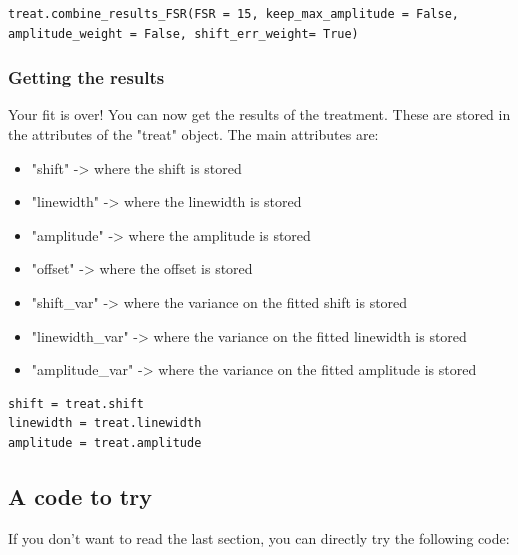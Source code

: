 \documentclass{article}
\begin{document}
\begin{lstlisting}
treat.combine_results_FSR(FSR = 15, keep_max_amplitude = False, amplitude_weight = False, shift_err_weight= True)
\end{lstlisting}

\subsubsection{Getting the results}

Your fit is over! You can now get the results of the treatment. These are stored in the attributes of the "treat" object. The main attributes are:
\begin{itemize}
    \item "shift" -> where the shift is stored
    \item "linewidth" -> where the linewidth is stored
    \item "amplitude" -> where the amplitude is stored
    \item "offset" -> where the offset is stored
    \item "shift\_var" -> where the variance on the fitted shift is stored
    \item "linewidth\_var" -> where the variance on the fitted linewidth is stored
    \item "amplitude\_var" -> where the variance on the fitted amplitude is stored
\end{itemize}

\begin{lstlisting}
shift = treat.shift
linewidth = treat.linewidth
amplitude = treat.amplitude
\end{lstlisting}

\subsection{A code to try}

If you don't want to read the last section, you can directly try the following code:
\end{document}
